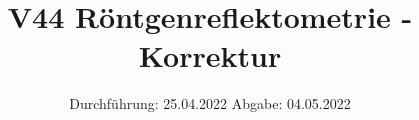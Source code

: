 

\subject{Fortgeschrittenenpraktikum}
\title{V44 Röntgenreflektometrie - Korrektur}
\date{%
  Durchführung: 25.04.2022
  \hspace{3em}
  Abgabe: 04.05.2022
}



\maketitle
\thispagestyle{empty}
\tableofcontents
\newpage








\printbibliography{}




